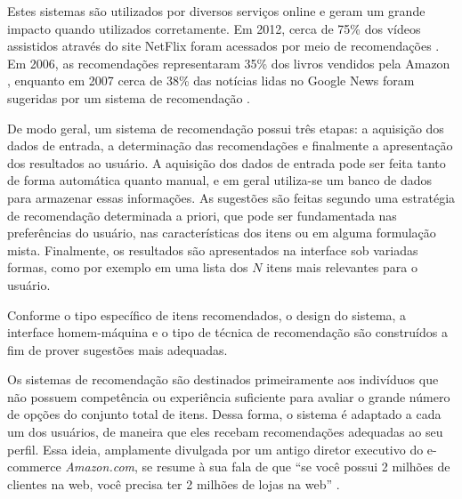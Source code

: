 Estes sistemas são utilizados por diversos serviços online e geram um grande impacto quando utilizados corretamente. Em 2012, cerca de 75\% dos vídeos assistidos através do site NetFlix foram acessados por meio de recomendações \cite{netflix75}. Em 2006, as recomendações representaram 35\% dos livros vendidos pela Amazon \cite{amazon35}, enquanto em 2007 cerca de 38\% das notícias lidas no Google News  foram sugeridas por um sistema de recomendação \cite{das2007google}.

De modo geral, um sistema de recomendação possui três etapas: a aquisição dos dados de entrada, a determinação das recomendações e finalmente a apresentação dos resultados ao usuário. A aquisição dos dados de entrada pode ser feita tanto de forma automática quanto manual, e em geral utiliza-se um banco de dados para armazenar essas informações. As sugestões são feitas segundo uma estratégia de recomendação determinada a priori, que pode ser fundamentada nas preferências do usuário, nas características dos itens ou em alguma formulação mista. Finalmente, os resultados são apresentados na interface sob variadas formas, como por exemplo em uma lista dos $N$ itens mais relevantes para o usuário.   

Conforme o tipo específico de itens recomendados, o design do sistema, a interface homem-máquina e o tipo de técnica de recomendação são construídos a fim de prover sugestões mais adequadas.

Os sistemas de recomendação são destinados primeiramente aos indivíduos que não possuem competência ou experiência suficiente para avaliar o grande número de opções do conjunto total de itens. Dessa forma, o sistema é adaptado a cada um dos usuários, de maneira que eles recebam recomendações adequadas ao seu perfil. Essa ideia, amplamente divulgada por um antigo diretor executivo do e-commerce \textit{Amazon.com}, se resume à sua fala de que ``se você possui 2 milhões de clientes na web, você precisa ter 2 milhões de lojas na web'' \cite{schafer1999recommender}. 